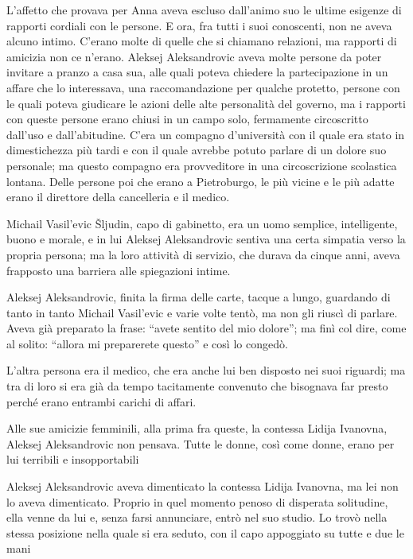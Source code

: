 L'affetto che provava per Anna aveva escluso dall'animo suo le ultime esigenze di rapporti cordiali con le persone. E ora, fra tutti i suoi conoscenti, non ne aveva alcuno intimo. C'erano molte di quelle che si chiamano relazioni, ma rapporti di amicizia non ce n'erano. Aleksej Aleksandrovic aveva molte persone da poter invitare a pranzo a casa sua, alle quali poteva chiedere la partecipazione in un affare che lo interessava, una raccomandazione per qualche protetto, persone con le quali poteva giudicare le azioni delle alte personalità del governo, ma i rapporti con queste persone erano chiusi in un campo solo, fermamente circoscritto dall'uso e dall'abitudine. C'era un compagno d'università con il quale era stato in dimestichezza più tardi e con il quale avrebbe potuto parlare di un dolore suo personale; ma questo compagno era provveditore in una circoscrizione scolastica lontana. Delle persone poi che erano a Pietroburgo, le più vicine e le più adatte erano il direttore della cancelleria e il medico. 

Michail Vasil'evic Šljudin, capo di gabinetto, era un uomo semplice, intelligente, buono e morale, e in lui Aleksej Aleksandrovic sentiva una certa simpatia verso la propria persona; ma la loro attività di servizio, che durava da cinque anni, aveva frapposto una barriera alle spiegazioni intime. 

Aleksej Aleksandrovic, finita la firma delle carte, tacque a lungo, guardando di tanto in tanto Michail Vasil'evic e varie volte tentò, ma non gli riuscì di parlare. Aveva già preparato la frase: ``avete sentito del mio dolore''; ma finì col dire, come al solito: ``allora mi preparerete questo'' e così lo congedò. 

L'altra persona era il medico, che era anche lui ben disposto nei suoi riguardi; ma tra di loro si era già da tempo tacitamente convenuto che bisognava far presto perché erano entrambi carichi di affari. 

Alle sue amicizie femminili, alla prima fra queste, la contessa Lidija Ivanovna, Aleksej Aleksandrovic non pensava. Tutte le donne, così come donne, erano per lui terribili e insopportabili 

\label{xxii-4} 

Aleksej Aleksandrovic aveva dimenticato la contessa Lidija Ivanovna, ma lei non lo aveva dimenticato. Proprio in quel momento penoso di disperata solitudine, ella venne da lui e, senza farsi annunciare, entrò nel suo studio. Lo trovò nella stessa posizione nella quale si era seduto, con il capo appoggiato su tutte e due le mani 

